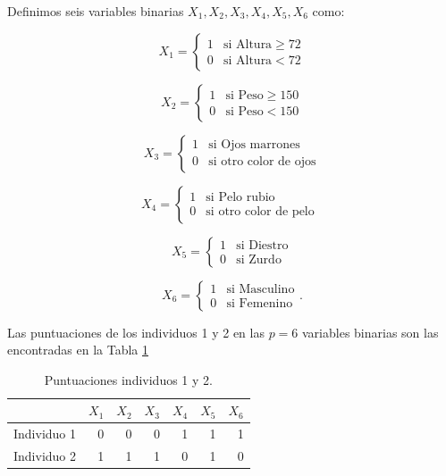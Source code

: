 \documentclass[a4paper, 20pt]{article}
\begin{document}
Definimos seis variables binarias $X_1,X_2,X_3,X_4,X_5,X_6$ como:

$$X_1 = \left \{ \begin{matrix} 1 & \mbox{si Altura}  \geq 72 
\\ 0 & \mbox{si Altura}  < 72 \end{matrix}\right.$$

$$X_2 = \left \{ \begin{matrix} 1 & \mbox{si Peso}  \geq 150 
\\ 0 & \mbox{si Peso}  < 150 \end{matrix}\right.   $$

$$X_3 = \left \{ \begin{matrix} 1 & \mbox{si Ojos marrones} 
\\ 0 & \mbox{si otro color de ojos}\end{matrix}\right.   $$

$$X_4 = \left \{ \begin{matrix} 1 & \mbox{si Pelo rubio} 
\\ 0 & \mbox{si otro color de pelo } \end{matrix}\right.   $$

$$X_5 = \left \{ \begin{matrix} 1 & \mbox{si Diestro} 
\\ 0 & \mbox{si Zurdo } \end{matrix}\right.   $$

$$X_6 = \left \{ \begin{matrix} 1 & \mbox{si Masculino} 
\\ 0 & \mbox{si Femenino}  \end{matrix}\right.   .$$

Las puntuaciones de los individuos 1 y 2 en las $p=6$ variables binarias son las encontradas en la Tabla \ref{tab:puntuaciones}

\begin{table}[h]
  \centering
  \caption{Puntuaciones individuos 1 y 2.}
  \label{tab:puntuaciones}
\resizebox{8cm}{!} {
  \begin{tabular}{lrrrrrr}
    \toprule
            & \multicolumn{1}{l}{$X_1$} & \multicolumn{1}{l}{$X_2$} & \multicolumn{1}{l}{$X_3$} & \multicolumn{1}{l}{$X_4$} & \multicolumn{1}{l}{$X_5$} & \multicolumn{1}{l}{$X_6$} \\ \midrule
Individuo 1 & 0                        & 0                        & 0                        & 1                        & 1                        & 1                        \\
Individuo 2 & 1                        & 1                        & 1                        & 0                        & 1                        & 0\\
\bottomrule
\end{tabular}
}
\end{table}
\end{document}
